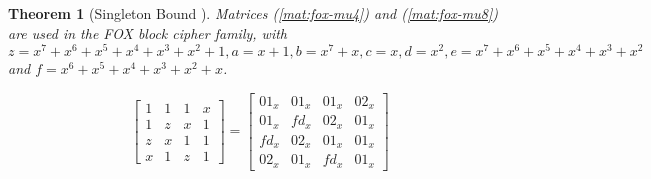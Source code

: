 \documentclass{report}
\newtheorem{theorem}{Theorem}{\bfseries}{\itshape}
\begin{document}
\begin{theorem}[Singleton Bound \cite{SloaneBook}]

Matrices (\ref{mat:fox-mu4}) and (\ref{mat:fox-mu8}) are used in the FOX block cipher family, with $z = x^7+x^6+x^5+x^4+x^3+x^2+1, a = x+1, b = x^7+x, c = x, d = x^2, e = x^7+x^6+x^5+x^4+x^3+x^2$ and $f = x^6+x^5+x^4+x^3+x^2+x$.

\begin{equation}\label{mat:fox-mu4}
\begin{bmatrix}
1 & 1 & 1 & x\\
1 & z & x & 1\\
z & x & 1 & 1\\
x & 1 & z & 1
\end{bmatrix}
=
\begin{bmatrix}
01_x & 01_x & 01_x & 02_x\\
01_x & fd_x & 02_x & 01_x\\
fd_x & 02_x & 01_x & 01_x\\
02_x & 01_x & fd_x & 01_x
\end{bmatrix}
\end{equation}


\end{theorem}
\end{document}
